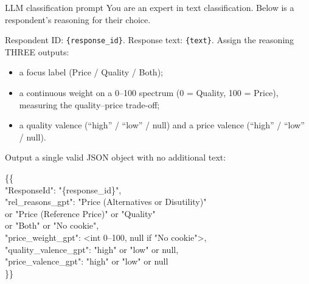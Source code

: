 \documentclass[10pt]{beamer}   %
\begin{document}
\begin{frame}{LLM classification prompt}
\small
You are an expert in text classification. Below is a respondent's reasoning for their choice.

\medskip
Respondent ID: \texttt{\{response\_id\}}. Response text: \texttt{\{text\}}.
\medskip
Assign the reasoning THREE outputs:
\begin{itemize}
\item a focus label (Price / Quality / Both);
\item a continuous weight on a 0--100 spectrum (0 = Quality, 100 = Price), measuring the quality--price trade-off;
\item a quality valence (``high'' / ``low'' / null) and a price valence (``high'' / ``low'' / null).
\end{itemize}

\medskip
\small
Output a single valid JSON object with no additional text:

\vspace{4pt}
{\ttfamily\scriptsize
\{\{ \\
\hspace*{1em}"ResponseId": "\{response\_id\}", \\
\hspace*{1em}"rel\_reasons\_gpt": "Price (Alternatives or Disutility)" \\
\hspace*{2.6em}or "Price (Reference Price)" or "Quality" \\
\hspace*{2.6em}or "Both" or "No cookie", \\
\hspace*{1em}"price\_weight\_gpt": \textless int 0--100, null if "No cookie"\textgreater, \\
\hspace*{1em}"quality\_valence\_gpt": "high" or "low" or null, \\
\hspace*{1em}"price\_valence\_gpt": "high" or "low" or null \\
\}\}
\par}

\end{frame}
\end{document}
